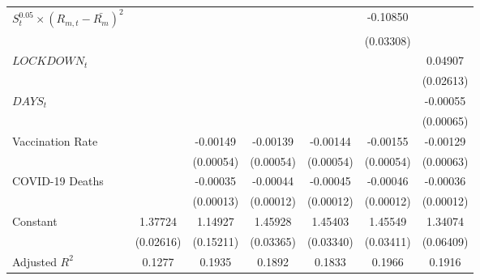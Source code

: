 \begin{table}[htbp]
\begin{threeparttable}
\begin{tabular}{l*{6}{c}}
\addlinespace
$S_t^{0.05}\times{(R_{m,t}-\bar{R_m})^2}$&                     &                     &                     &                     &    -0.10850\sym{***}&                     \\
                    &                     &                     &                     &                     &   (0.03308)         &                     \\
\addlinespace
$LOCKDOWN_t$&                     &                     &                     &                     &                     &     0.04907\sym{*}  \\
                    &                     &                     &                     &                     &                     &   (0.02613)         \\
\addlinespace
$DAYS_t$                &                     &                     &                     &                     &                     &    -0.00055         \\
                    &                     &                     &                     &                     &                     &   (0.00065)         \\
\addlinespace
Vaccination Rate    &                     &    -0.00149\sym{***}&    -0.00139\sym{***}&    -0.00144\sym{***}&    -0.00155\sym{***}&    -0.00129\sym{**} \\
                    &                     &   (0.00054)         &   (0.00054)         &   (0.00054)         &   (0.00054)         &   (0.00063)         \\
\addlinespace
COVID-19 Deaths&                     &    -0.00035\sym{***}&    -0.00044\sym{***}&    -0.00045\sym{***}&    -0.00046\sym{***}&    -0.00036\sym{***}\\
                    &                     &   (0.00013)         &   (0.00012)         &   (0.00012)         &   (0.00012)         &   (0.00012)         \\
\addlinespace
Constant            &     1.37724\sym{***}&     1.14927\sym{***}&     1.45928\sym{***}&     1.45403\sym{***}&     1.45549\sym{***}&     1.34074\sym{***}\\
                    &   (0.02616)         &   (0.15211)         &   (0.03365)         &   (0.03340)         &   (0.03411)         &   (0.06409)         \\
\midrule
Adjusted $R^2$        &         0.1277         &         0.1935         &         0.1892         &         0.1833         &         0.1966         &         0.1916         \\

\end{tabular}
\end{threeparttable}
\end{table}
